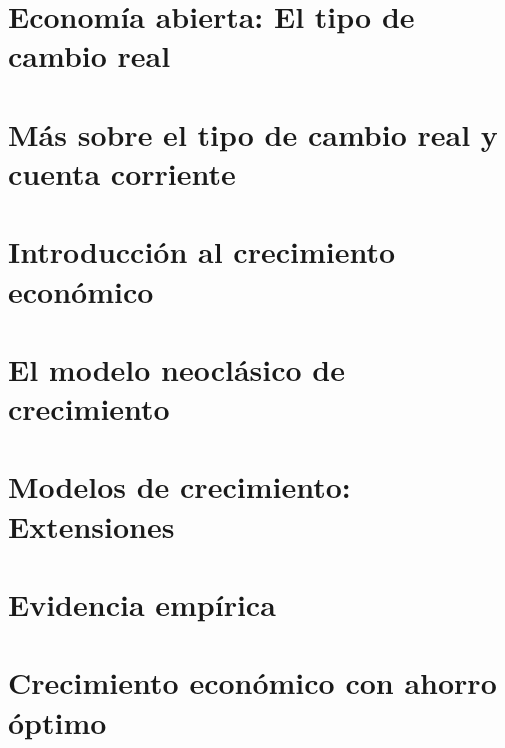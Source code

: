 \documentclass{article}
\numberwithin{figure}{section}
\begin{document}
\section{Economía abierta: El tipo de cambio real}
    
    
    
    
    
    
    
\section{Más sobre el tipo de cambio real y cuenta corriente} %

\section{Introducción al crecimiento económico} %
    
\section{El modelo neoclásico de crecimiento}
    
    
    
    
    
    
    
    
    
    
\section{Modelos de crecimiento: Extensiones}
    
    
    

\section{Evidencia empírica}
    

\section{Crecimiento económico con ahorro óptimo}
    
    
    
    
\end{document}
